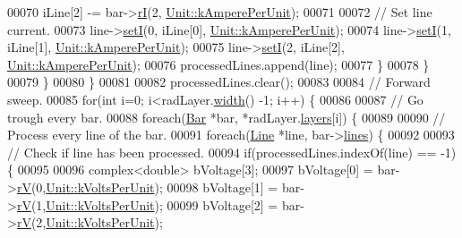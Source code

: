 \begin{DoxyCode}
00070             iLine[2] -= bar->\hyperlink{group___models_ga8a009531f01430aa68eba739bb0dc2ea}{rI}(2, \hyperlink{class_unit_a0794cf6c9682f48296dd4a5315389787aeed3b50e464d581cb630181a3b6a0709}{Unit::kAmperePerUnit});
00071 
00072             \textcolor{comment}{// Set line current.}
00073             line->\hyperlink{group___models_ga9e55b06dc3e385838fdd13d5580438ef}{setI}(0, iLine[0], \hyperlink{class_unit_a0794cf6c9682f48296dd4a5315389787aeed3b50e464d581cb630181a3b6a0709}{Unit::kAmperePerUnit});
00074             line->\hyperlink{group___models_ga9e55b06dc3e385838fdd13d5580438ef}{setI}(1, iLine[1], \hyperlink{class_unit_a0794cf6c9682f48296dd4a5315389787aeed3b50e464d581cb630181a3b6a0709}{Unit::kAmperePerUnit});
00075             line->\hyperlink{group___models_ga9e55b06dc3e385838fdd13d5580438ef}{setI}(2, iLine[2], \hyperlink{class_unit_a0794cf6c9682f48296dd4a5315389787aeed3b50e464d581cb630181a3b6a0709}{Unit::kAmperePerUnit});
00076             processedLines.append(line);
00077           \}
00078         \}
00079       \}
00080     \}
00081 
00082     processedLines.clear();
00083 
00084     \textcolor{comment}{// Forward sweep.}
00085     \textcolor{keywordflow}{for}(\textcolor{keywordtype}{int} i=0; i<radLayer.\hyperlink{class_radial_layer_ae8b32d0711cc6f4dbec832bb07d59a49}{width}() -1; i++) \{
00086 
00087       \textcolor{comment}{// Go trough every bar.}
00088       \textcolor{keywordflow}{foreach}(\hyperlink{class_bar}{Bar} *bar, *radLayer.\hyperlink{class_radial_layer_a714c36b1ab50a7778953e924ddac2787}{layers}[i]) \{
00089 
00090         \textcolor{comment}{// Process every line of the bar.}
00091         \textcolor{keywordflow}{foreach}(\hyperlink{class_line}{Line} *line, bar->\hyperlink{class_bar_a23b6d4319352ef0e77ad66aade4e0209}{lines}) \{
00092 
00093           \textcolor{comment}{// Check if line has been processed.}
00094           \textcolor{keywordflow}{if}(processedLines.indexOf(line) == -1) \{
00095 
00096             complex<double> bVoltage[3];
00097             bVoltage[0] = bar->\hyperlink{group___models_ga2d1f6bfbd8abaf168bb75bd8e5cd9b5e}{rV}(0,\hyperlink{class_unit_a55b07dfa9457e1eca2c7194fe0cfc3c1ab44b1310b59fdcdc9df5bbea91da4206}{Unit::kVoltsPerUnit});
00098             bVoltage[1] = bar->\hyperlink{group___models_ga2d1f6bfbd8abaf168bb75bd8e5cd9b5e}{rV}(1,\hyperlink{class_unit_a55b07dfa9457e1eca2c7194fe0cfc3c1ab44b1310b59fdcdc9df5bbea91da4206}{Unit::kVoltsPerUnit});
00099             bVoltage[2] = bar->\hyperlink{group___models_ga2d1f6bfbd8abaf168bb75bd8e5cd9b5e}{rV}(2,\hyperlink{class_unit_a55b07dfa9457e1eca2c7194fe0cfc3c1ab44b1310b59fdcdc9df5bbea91da4206}{Unit::kVoltsPerUnit});

\end{DoxyCode}
